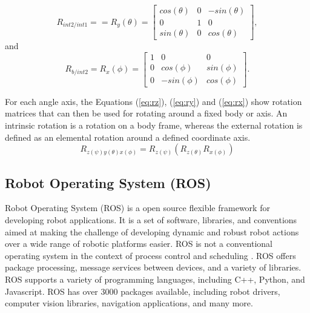 \begin{equation}
    R_{int2/int1} = = R_{y}(\theta) =  \begin{bmatrix}
cos(\theta)  & 0 & -sin(\theta)\\ 
0 & 1 & 0 \\ 
sin(\theta) & 0 & cos(\theta)
\end{bmatrix},
\end{equation}\label{eq:ry}
and 
\begin{equation}
    R_{b/int2} = R_{x}(\phi) =\begin{bmatrix}
1  & 0 & 0\\ 
0 & cos(\phi) & sin(\phi) \\ 
0 & -sin(\phi) & cos(\phi)
\end{bmatrix}.
\end{equation}\label{eq:rx}


For each angle axis, the Equations (\ref{eq:rz}), (\ref{eq:ry}) and (\ref{eq:rx})  show rotation matrices that can then be used for rotating around a fixed body or axis. An intrinsic rotation is a rotation on a body frame, whereas the external rotation is defined as an elemental rotation around a defined coordinate axis.
\begin{equation}
    R_{z(\psi)y(\theta)x(\phi)} = R_{z(\psi)} (R_{z(\theta)}R_{x(\phi)})
\end{equation}


\subsection{Robot Operating System (ROS)}
Robot Operating System (ROS) is a open source flexible framework for developing robot applications. It is a set of software, libraries, and conventions aimed at making the challenge of developing dynamic and robust robot actions over a wide range of robotic platforms easier. ROS is not a conventional operating system in the context of process control and scheduling \cite{quigley_ros_2009}. ROS offers package processing, message services between devices, and a variety of libraries. ROS supports a variety of programming languages, including C++, Python, and Javascript. ROS has over 3000 packages available, including robot drivers, computer vision libraries, navigation applications, and many more.


